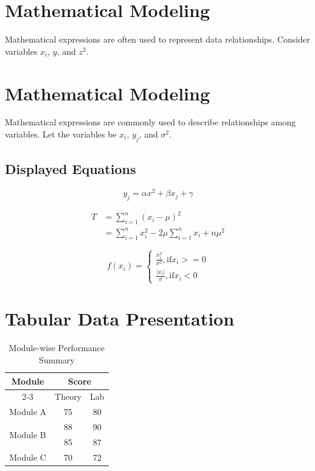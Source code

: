 \documentclass{article}
\begin{document}
\section{Mathematical Modeling}
Mathematical expressions are often used to represent data relationships. Consider variables $x_i$, $y$, and $z^2$.

\section{Mathematical Modeling}
Mathematical expressions are commonly used to describe relationships among variables. Let the variables be $x_i$, $y_j$, and $\sigma^2$.

\subsection{Displayed Equations}
\begin{equation}
    y_j = \alpha x^2 + \beta x_j + \gamma
\end{equation}

\begin{equation}
\begin{split}
    T &= \sum_{i = 1}^{n}\left( x_i - \mu \right) ^2 \\
    &= \sum_{i = 1}^{n}x_i^2 - 2\mu \sum_{i = 1}^{n} x_i + n \mu ^2
\end{split}
\end{equation}

\[
f(x_i) = \begin{cases}
    \frac{x_i^2}{\sigma^2},  \text{if} x_i >= 0 \\
    \frac{|x_i|}{\sigma}, \text{if} x_i < 0
\end{cases}
\]

\section{Tabular Data Presentation}
\begin{table}[H]
    \centering
    \begin{tabular}{|c|c|c|}
        \hline
         \multirow{2}{*}{\textbf{Module}} & \multicolumn{2}{c|}{\textbf{Score}}  \\ \cline{2-3} & Theory & Lab \\
         \hline
         Module A & 75 & 80 \\
         \hline
         \multirow{2}{*}{Module B} & 88 & 90 \\ & 85 & 87 \\
         \hline
         Module C & 70 & 72 \\
         \hline
    \end{tabular}
    \caption{Module-wise Performance Summary}
    \label{tab:t1}
\end{table}
\end{document}
